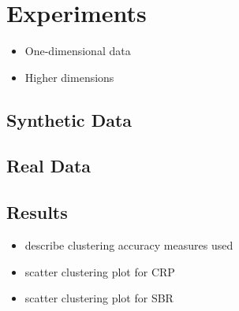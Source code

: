\section{Experiments}

\begin{itemize}
	\item One-dimensional data
	\item Higher dimensions
\end{itemize}

\subsection{Synthetic Data}

\subsection{Real Data}

\subsection{Results}
\begin{itemize}
	\item describe clustering accuracy measures used
	\item scatter clustering plot for CRP
	\item scatter clustering plot for SBR
\end{itemize}
